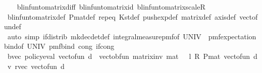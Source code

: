 \begin{isabellebody}
%
\isadelimproof
\ \ %
\endisadelimproof
%
\isatagproof
{}\isamarkupfalse%
\ blinfun{\isacharunderscore}{\kern0pt}to{\isacharunderscore}{\kern0pt}matrix{\isacharunderscore}{\kern0pt}diff\ blinfun{\isacharunderscore}{\kern0pt}to{\isacharunderscore}{\kern0pt}matrix{\isacharunderscore}{\kern0pt}id\ blinfun{\isacharunderscore}{\kern0pt}to{\isacharunderscore}{\kern0pt}matrix{\isacharunderscore}{\kern0pt}scaleR\isanewline
\ \ \isamarkupfalse%
\ blinfun{\isacharunderscore}{\kern0pt}to{\isacharunderscore}{\kern0pt}matrix{\isacharunderscore}{\kern0pt}def\ P{\isacharunderscore}{\kern0pt}mat{\isacharunderscore}{\kern0pt}def\ {\isasymP}rep{\isacharunderscore}{\kern0pt}eq\ K{\isacharunderscore}{\kern0pt}st{\isacharunderscore}{\kern0pt}def\ push{\isacharunderscore}{\kern0pt}exp{\isacharunderscore}{\kern0pt}def\ matrix{\isacharunderscore}{\kern0pt}def\ axis{\isacharunderscore}{\kern0pt}def\ vec{\isacharunderscore}{\kern0pt}to{\isacharunderscore}{\kern0pt}fun{\isacharunderscore}{\kern0pt}def\isanewline
\ \ \isamarkupfalse%
\ {\isacharparenleft}{\kern0pt}auto\ simp{\isacharcolon}{\kern0pt}\ if{\isacharunderscore}{\kern0pt}distrib\ mk{\isacharunderscore}{\kern0pt}dec{\isacharunderscore}{\kern0pt}det{\isacharunderscore}{\kern0pt}def\ integral{\isacharunderscore}{\kern0pt}measure{\isacharunderscore}{\kern0pt}pmf{\isacharbrackleft}{\kern0pt}of\ UNIV{\isacharbrackright}{\kern0pt}\ \ pmf{\isacharunderscore}{\kern0pt}expectation{\isacharunderscore}{\kern0pt}bind{\isacharbrackleft}{\kern0pt}of\ UNIV{\isacharbrackright}{\kern0pt}\ pmf{\isacharunderscore}{\kern0pt}bind\ cong{\isacharcolon}{\kern0pt}\ if{\isacharunderscore}{\kern0pt}cong{\isacharparenright}{\kern0pt}%
\endisatagproof
{\isafoldproof}%
%
\isadelimproof
\isanewline
%
\endisadelimproof
\isanewline
{}\isamarkupfalse%
\ {\isasymnu}\isactrlsub b{\isacharunderscore}{\kern0pt}vec{\isacharcolon}{\kern0pt}\ {\isachardoublequoteopen}policy{\isacharunderscore}{\kern0pt}eval{\isacharprime}{\kern0pt}\ {\isacharparenleft}{\kern0pt}vec{\isacharunderscore}{\kern0pt}to{\isacharunderscore}{\kern0pt}fun\ d{\isacharparenright}{\kern0pt}\ {\isacharequal}{\kern0pt}\ vec{\isacharunderscore}{\kern0pt}to{\isacharunderscore}{\kern0pt}bfun\ {\isacharparenleft}{\kern0pt}matrix{\isacharunderscore}{\kern0pt}inv\ {\isacharparenleft}{\kern0pt}mat\ {}\ {\isacharminus}{\kern0pt}\ l\ {\isacharasterisk}{\kern0pt}\isactrlsub R\ {\isacharparenleft}{\kern0pt}P{\isacharunderscore}{\kern0pt}mat\ {\isacharparenleft}{\kern0pt}vec{\isacharunderscore}{\kern0pt}to{\isacharunderscore}{\kern0pt}fun\ d{\isacharparenright}{\kern0pt}{\isacharparenright}{\kern0pt}{\isacharparenright}{\kern0pt}\ {\isacharasterisk}{\kern0pt}v\ {\isacharparenleft}{\kern0pt}r{\isacharunderscore}{\kern0pt}vec{\isacharprime}{\kern0pt}\ {\isacharparenleft}{\kern0pt}vec{\isacharunderscore}{\kern0pt}to{\isacharunderscore}{\kern0pt}fun\ d{\isacharparenright}{\kern0pt}{\isacharparenright}{\kern0pt}{\isacharparenright}{\kern0pt}{\isachardoublequoteclose}\isanewline

\end{isabellebody}

